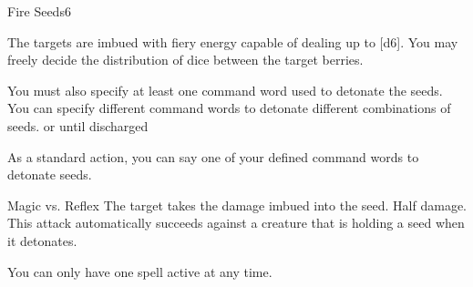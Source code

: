 \begin{spellsection}{Fire Seeds}{6}
\begin{spellheader}
\end{spellheader}
\begin{spellcontent}
    \begin{spelltargetinginfo}
    \end{spelltargetinginfo}
    \begin{spelleffects}
        \spelleffect The targets are imbued with fiery energy capable of dealing up to [d6]. You may freely decide the distribution of dice between the target berries.
        
        You must also specify at least one command word used to detonate the seeds. You can specify different command words to detonate different combinations of seeds.
        \spelldur \durext or until discharged
    \end{spelleffects}
\end{spellcontent}
\begin{spellsubcontent}
    \begin{spelltargetinginfo}
        \spellspecial As a standard action, you can say one of your defined command words to detonate seeds.
        \spellrng{\rngmed}
    \end{spelltargetinginfo}
    \begin{spelleffects}
        \begin{spellattack}{Magic vs. Reflex}
            \spellsuccess The target takes the damage imbued into the seed.
            \spellfailure Half damage.
            \spellspecial This attack automatically succeeds against a creature that is holding a seed when it detonates.
        \end{spellattack}
    \end{spelleffects}
\end{spellsubcontent}
\begin{spellfooter}
    \spellnotes You can only have one  spell active at any time.
\end{spellfooter}
\end{spellsection}

